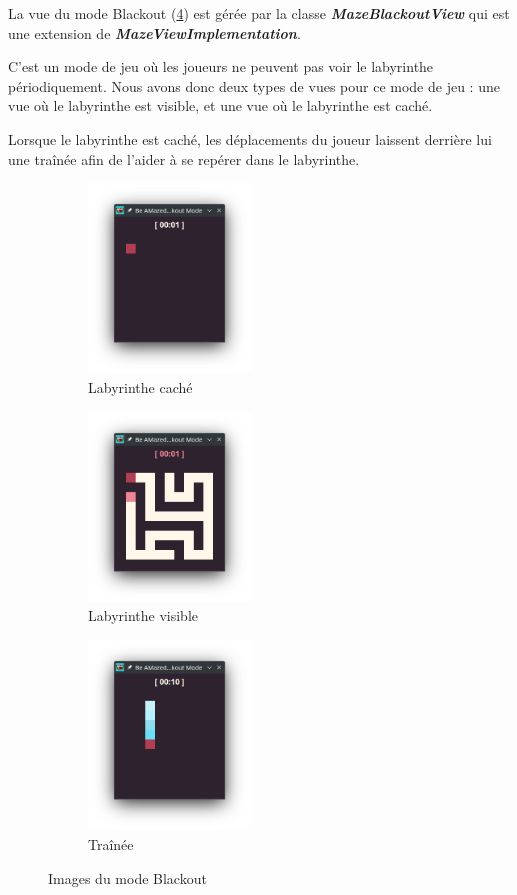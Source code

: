 La vue du mode Blackout (\ref{fig:BlackoutModeLabyrinth}) est gérée par la classe \textbf{\textit{MazeBlackoutView}} qui est une extension de \textbf{\textit{MazeViewImplementation}}.

C'est un mode de jeu où les joueurs ne peuvent pas voir le labyrinthe périodiquement. Nous avons donc deux types de vues pour ce mode de jeu : une vue où le labyrinthe est visible, et une vue où le labyrinthe est caché.

Lorsque le labyrinthe est caché, les déplacements du joueur laissent derrière lui une traînée afin de l'aider à se repérer dans le labyrinthe.

\begin{figure}[!htb]%
    \centering
    \begin{subfigure}{4.3cm}
        \includegraphics[width=4.3cm]{ressources/Implementation/Labyrinthe/Vue/Blackout/BlackoutDark.png}%
        \caption{Labyrinthe caché}
        \label{fig:HiddenLabyrinth}
    \end{subfigure}
    \qquad
    \begin{subfigure}{4.3cm}
        \includegraphics[width=4.3cm]{ressources/Implementation/Labyrinthe/Vue/Blackout/BlackoutLight.png}%
        \caption{Labyrinthe visible}
        \label{fig:VisibleLabyrinth}
    \end{subfigure}
    \qquad
    \begin{subfigure}{4.3cm}
        \includegraphics[width=4.3cm]{ressources/Implementation/Labyrinthe/Vue/Blackout/BlackoutDarkParticles.png}%
        \caption{Traînée}
        \label{fig:HiddenLabyrinthWithParticles}
    \end{subfigure}
    \caption{Images du mode Blackout}%
    \label{fig:BlackoutModeLabyrinth}
\end{figure}
